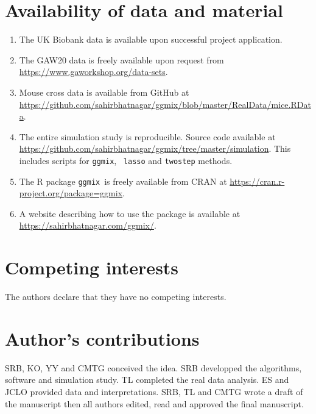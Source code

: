 \documentclass[12pt,letter]{article}\usepackage[]{graphicx}\usepackage[]{color}
\newcommand{\ggmix}{\texttt{ggmix}}
\begin{document}
\newpage







\section*{Availability of data and material}
\begin{enumerate}
	\item The UK Biobank data is available upon successful project application.
	\item The GAW20 data is freely available upon request from \url{https://www.gaworkshop.org/data-sets}.
	\item Mouse cross data is available from GitHub at \url{https://github.com/sahirbhatnagar/ggmix/blob/master/RealData/mice.RData}. 
	\item The entire simulation study is reproducible. Source code available at \url{https://github.com/sahirbhatnagar/ggmix/tree/master/simulation}. This includes scripts for \ggmix, ~\texttt{lasso} and \texttt{twostep} methods. 
	\item The R package \ggmix ~is freely available from CRAN at \url{https://cran.r-project.org/package=ggmix}.
	\item A website describing how to use the package is available at \url{https://sahirbhatnagar.com/ggmix/}.
\end{enumerate}

\section*{Competing interests}
The authors declare that they have no competing interests.

\section*{Author's contributions}
SRB, KO, YY and CMTG conceived the idea. SRB developped the algorithms, software and simulation study. TL completed the real data analysis. ES and JCLO provided data and interpretations. SRB, TL and CMTG wrote a draft of the manuscript then all authors edited, read and approved the final manuscript.
\end{document}
